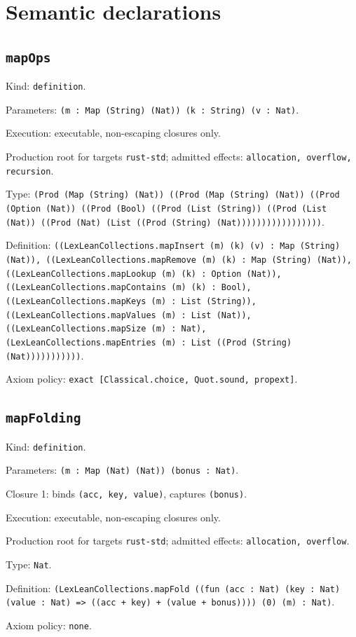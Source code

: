 \documentclass[11pt]{article}
\begin{document}
\section*{Semantic declarations}
\subsection*{\texttt{mapOps}}
\noindent Kind: \texttt{definition}.\par
\noindent Parameters: \texttt{(m : Map (String) (Nat)) (k : String) (v : Nat)}.\par
\noindent Execution: executable, non-escaping closures only.\par
\noindent Production root for targets \texttt{rust-std}; admitted effects: \texttt{allocation, overflow, recursion}.\par
\noindent Type: \texttt{(Prod (Map (String) (Nat)) ((Prod (Map (String) (Nat)) ((Prod (Option (Nat)) ((Prod (Bool) ((Prod (List (String)) ((Prod (List (Nat)) ((Prod (Nat) (List ((Prod (String) (Nat)))))))))))))))))}.\par
\noindent Definition: \texttt{((LexLeanCollections.mapInsert (m) (k) (v) : Map (String) (Nat)), ((LexLeanCollections.mapRemove (m) (k) : Map (String) (Nat)), ((LexLeanCollections.mapLookup (m) (k) : Option (Nat)), ((LexLeanCollections.mapContains (m) (k) : Bool), ((LexLeanCollections.mapKeys (m) : List (String)), ((LexLeanCollections.mapValues (m) : List (Nat)), ((LexLeanCollections.mapSize (m) : Nat), (LexLeanCollections.mapEntries (m) : List ((Prod (String) (Nat)))))))))))}.\par
\noindent Axiom policy: \texttt{exact [Classical.choice, Quot.sound, propext]}.\par
\subsection*{\texttt{mapFolding}}
\noindent Kind: \texttt{definition}.\par
\noindent Parameters: \texttt{(m : Map (Nat) (Nat)) (bonus : Nat)}.\par
\noindent Closure 1: binds \texttt{(acc, key, value)}, captures \texttt{(bonus)}.\par
\noindent Execution: executable, non-escaping closures only.\par
\noindent Production root for targets \texttt{rust-std}; admitted effects: \texttt{allocation, overflow}.\par
\noindent Type: \texttt{Nat}.\par
\noindent Definition: \texttt{(LexLeanCollections.mapFold ((fun (acc : Nat) (key : Nat) (value : Nat) => ((acc + key) + (value + bonus)))) (0) (m) : Nat)}.\par
\noindent Axiom policy: \texttt{none}.\par
\end{document}
